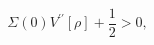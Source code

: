 \begin{equation}
\Sigma(0) V^{\prime \prime} [\rho] + \frac{1}{2}  >0, \label{eq:pos}
\end{equation}

